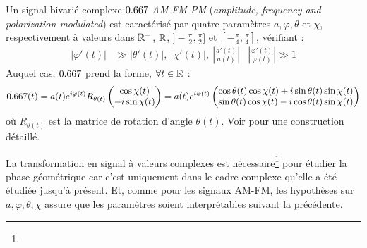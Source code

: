 \begin{definition}[Signal AM-FM-PM] \label{def:AM-FM-PM}
	Un signal bivarié complexe $\x$ \emph{AM-FM-PM} (\emph{amplitude, frequency and polarization modulated}) est caractérisé par quatre paramètres $a,\varphi,\theta$ et $\chi$, respectivement à valeurs dans $\mathbb{R}^+$, $\mathbb{R}$, $]-\frac{\pi}{2}, \frac{\pi}{2}]$ et $[-\frac{\pi}{4}, \frac{\pi}{4}]$, vérifiant :
	\begin{align}\label{eq:condi_AM-FM-PM}
		\big| \varphi'(t) \big| &\gg \big| \theta'(t) \big| ,\ \big| \chi'(t) \big| ,\ \left| \frac{a'(t)}{a(t)}\right|  &  \left| \frac{\varphi'(t)}{\varphi(t)}\right| \gg 1
	\end{align}
	Auquel cas, $\x$ prend la forme, $\forall t\in\mathbb{R}$ :
	\begin{equation}\label{eq:AM-FM-PM}
		\x(t) = a(t)e^{i\varphi(t)} R_{\theta(t)} \begin{pmatrix} \cos\chi(t) \\ -i\sin\chi(t) \end{pmatrix} 
		= a(t)e^{i\varphi(t)} \begin{pmatrix} \cos\theta(t) \cos\chi(t) + i\sin\theta(t) \sin\chi(t) \\ \sin\theta(t) \cos\chi(t) - i\cos\theta(t) \sin\chi(t) \end{pmatrix}
	\end{equation}
	où $R_{\theta(t)}$ est la matrice de rotation d'angle $\theta(t)$. Voir \cite[ann. 4.B]{flamant_approche_2018} pour une construction détaillé.
\end{definition}
\skipl

La transformation en signal à valeurs complexes est nécessaire\footnote{
	}
pour étudier la phase géométrique car c'est uniquement dans le cadre complexe qu'elle a été étudiée jusqu'à présent. 
Et, comme pour les signaux AM-FM, les hypothèses sur $a,\varphi,\theta,\chi$ assure que les paramètres soient interprétables suivant la  précédente.
\\

